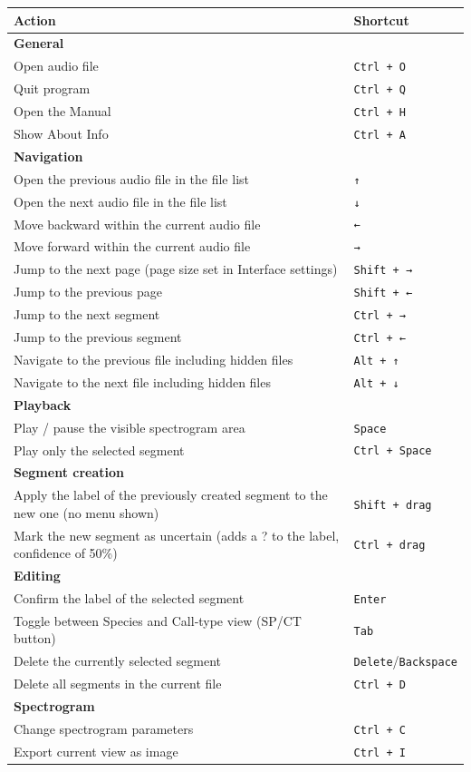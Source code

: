 \documentclass{scrartcl}
\begin{document}
\begin{longtable}{p{}p{}}
\toprule
\midrule
\textbf{Action} & \textbf{Shortcut} \\
\midrule
\textbf{General} & \\
Open audio file & \texttt{Ctrl + O} \\
Quit program & \texttt{Ctrl + Q} \\
Open the Manual & \texttt{Ctrl + H} \\
Show About Info & \texttt{Ctrl + A} \\
\midrule
\textbf{Navigation} & \\
Open the previous audio file in the file list & \texttt{↑} \\
Open the next audio file in the file list & \texttt{↓} \\
Move backward within the current audio file & \texttt{←} \\
Move forward within the current audio file & \texttt{→} \\
Jump to the next page (page size set in Interface settings) & \texttt{Shift + →} \\
Jump to the previous page & \texttt{Shift + ←} \\
Jump to the next segment & \texttt{Ctrl + →} \\
Jump to the previous segment & \texttt{Ctrl + ←}\\
Navigate to the previous file including hidden files & \texttt{Alt + ↑} \\
Navigate to the next file including hidden files & \texttt{Alt + ↓} \\
\midrule
\textbf{Playback} & \\
Play / pause the visible spectrogram area & \texttt{Space} \\
Play only the selected segment & \texttt{Ctrl + Space} \\
\midrule
\textbf{Segment creation} & \\
Apply the label of the previously created segment to the new one (no menu shown) & \texttt{Shift + drag} \\
Mark the new segment as uncertain (adds a ? to the label, confidence of 50\%) & \texttt{Ctrl + drag} \\
\midrule
\textbf{Editing} & \\
Confirm the label of the selected segment & \texttt{Enter} \\
Toggle between Species and Call‑type view (SP/CT button) & \texttt{Tab} \\
Delete the currently selected segment & \texttt{Delete}/\texttt{Backspace} \\
Delete all segments in the current file & \texttt{Ctrl + D} \\
\midrule
\textbf{Spectrogram} & \\
Change spectrogram parameters & \texttt{Ctrl + C} \\
Export current view as image & \texttt{Ctrl + I} \\
\midrule
\bottomrule
\end{longtable}

\end{document}
